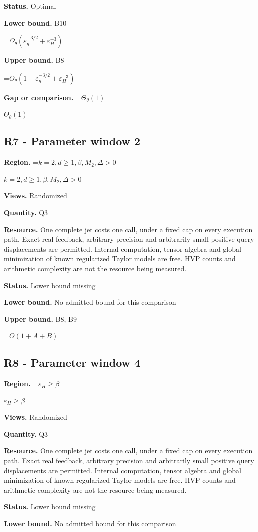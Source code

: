 \documentclass[10pt,a4paper]{article}
\newcommand{\AtlasMath}[1]{\par\begingroup\centering\setbox0=\hbox{$\displaystyle #1$}\ifdim\wd0>1.4\linewidth\typeout{ATLAS WIDE FORMULA: \the\wd0}\fi\ifdim\wd0>\linewidth\resizebox{\linewidth}{!}{\box0}\else\box0\fi\par\endgroup}
\newcommand{\AtlasInlineMath}[1]{\begingroup\setbox0=\hbox{$#1$}\ifdim\wd0>.4\linewidth\endgroup\AtlasMath{#1}\else\endgroup$#1$\fi}
\begin{document}
\textbf{Status.} Optimal

\textbf{Lower bound.} B10

\AtlasMath{\Omega_\theta(\varepsilon_g^{-3/2}+\varepsilon_H^{-3})}
\textbf{Upper bound.} B8

\AtlasMath{O_\theta(1+\varepsilon_g^{-3/2}+\varepsilon_H^{-3})}
\textbf{Gap or comparison.} \AtlasInlineMath{\Theta_\theta(1)}

\subsection{R7 - Parameter window 2}
\textbf{Region.} \AtlasInlineMath{k=2,d\ge 1,\beta,M_2,\Delta>0}

\textbf{Views.} Randomized

\textbf{Quantity.} Q3

\textbf{Resource.} One complete jet costs one call, under a fixed cap on every execution path. Exact real feedback, arbitrary precision and arbitrarily small positive query displacements are permitted. Internal computation, tensor algebra and global minimization of known regularized Taylor models are free. HVP counts and arithmetic complexity are not the resource being measured.

\textbf{Status.} Lower bound missing

\textbf{Lower bound.} No admitted bound for this comparison

\textbf{Upper bound.} B8, B9

\AtlasMath{O(1+A+B)}
\subsection{R8 - Parameter window 4}
\textbf{Region.} \AtlasInlineMath{\varepsilon_H\ge \beta}

\textbf{Views.} Randomized

\textbf{Quantity.} Q3

\textbf{Resource.} One complete jet costs one call, under a fixed cap on every execution path. Exact real feedback, arbitrary precision and arbitrarily small positive query displacements are permitted. Internal computation, tensor algebra and global minimization of known regularized Taylor models are free. HVP counts and arithmetic complexity are not the resource being measured.

\textbf{Status.} Lower bound missing

\textbf{Lower bound.} No admitted bound for this comparison
\end{document}
